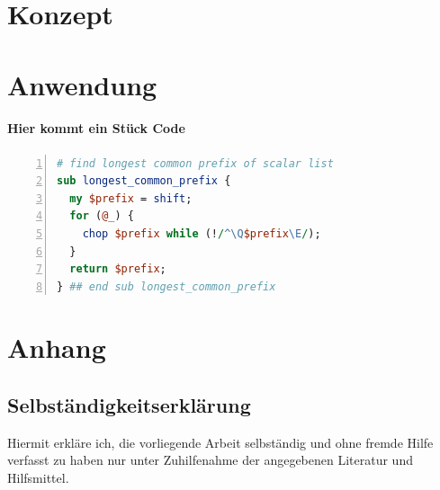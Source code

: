 \documentclass[12pt,a4paper,%
	             twoside,   %
	             openright,%
               titlepage,
               DIV12,
               pagesize=dvips,%
               headinclude,
               footinclude=false,%
               cleardoublepage=empty,%
               parskip=half,      %
               ]{scrbook}
\begin{document}
\part{Konzept\label{Konzept und Umsetzung}}


\part{Anwendung\label{Anwendung}}

%
\subsection{Hier kommt ein Stück Code}

\begin{lstlisting}[language=Perl,caption=Beschreibung,frame=shadowbox, rulesepcolor=\color{gray},numbers=left]
# find longest common prefix of scalar list
sub longest_common_prefix {
  my $prefix = shift;
  for (@_) {
    chop $prefix while (!/^\Q$prefix\E/);
  }
  return $prefix;
} ## end sub longest_common_prefix
\end{lstlisting}



\part*{Anhang}
\appendix

\chapter*{Selbständigkeitserklärung}

Hiermit erkläre ich, die vorliegende Arbeit selbständig und ohne fremde Hilfe verfasst zu haben nur unter Zuhilfenahme der angegebenen Literatur und Hilfsmittel.

\listoffigures %
\listoftables %


\printbibliography[title={Literaturverzeichnis}, heading=bibintoc]


{ %
\printindex
}
\end{document}
